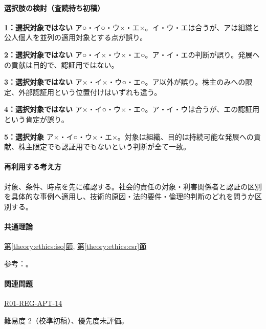 \paragraph{選択肢の検討（査読待ち初稿）}\mbox{}\par

\noindent\textbf{1：選択対象ではない} ア○・イ○・ウ×・エ×。イ・ウ・エは合うが、アは組織と公人個人を並列の適用対象とする点が誤り。\par

\noindent\textbf{2：選択対象ではない} ア○・イ×・ウ×・エ○。ア・イ・エの判断が誤り。発展への貢献は目的で、認証用ではない。\par

\noindent\textbf{3：選択対象ではない} ア×・イ×・ウ○・エ○。ア以外が誤り。株主のみへの限定、外部認証用という位置付けはいずれも違う。\par

\noindent\textbf{4：選択対象ではない} ア×・イ○・ウ×・エ○。ア・イ・ウは合うが、エの認証用という肯定が誤り。\par

\noindent\textbf{5：選択対象} ア×・イ○・ウ×・エ×。対象は組織、目的は持続可能な発展への貢献、株主限定でも認証用でもないという判断が全て一致。\par

\paragraph{再利用する考え方} 対象、条件、時点を先に確認する。社会的責任の対象・利害関係者と認証の区別を具体的な事例へ適用し、技術的原因・法的要件・倫理的判断のどれを問うか区別する。

\paragraph{共通理論} \hyperref[theory:ethics:iso]{第\ref*{theory:ethics:iso}節}, \hyperref[theory:ethics:csr]{第\ref*{theory:ethics:csr}節}

\par 参考：\cite{iso26000,iso26000_project2010}。

\paragraph{関連問題} \hyperref[q:r01-reg-apt-14]{R01-REG-APT-14}

\par 難易度 2（校準初稿）、優先度未評価。

